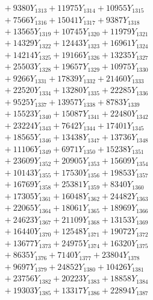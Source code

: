\documentclass[a4paper,10pt]{article}
\begin{document}
{\begin{align}
&\;  + 9380 Y_{1313} + 11975 Y_{1314} + 10955 Y_{1315} \\[0.3ex]
&\;  + 7566 Y_{1316} + 15041 Y_{1317} + 9387 Y_{1318} \\[0.5ex]\allowbreak
&\;  + 13565 Y_{1319} + 10745 Y_{1320} + 11979 Y_{1321} \\[0.3ex]
&\;  + 14329 Y_{1322} + 12443 Y_{1323} + 16961 Y_{1324} \\[0.3ex]
&\;  + 14214 Y_{1325} + 19166 Y_{1326} + 13235 Y_{1327} \\[0.3ex]
&\;  + 25503 Y_{1328} + 19657 Y_{1329} + 10975 Y_{1330} \\[0.3ex]
&\;  + 9266 Y_{1331} + 17839 Y_{1332} + 21460 Y_{1333} \\[0.3ex]
&\;  + 22520 Y_{1334} + 13280 Y_{1335} + 22285 Y_{1336} \\[0.3ex]
&\;  + 9525 Y_{1337} + 13957 Y_{1338} + 8783 Y_{1339} \\[0.3ex]
&\;  + 15523 Y_{1340} + 15087 Y_{1341} + 22480 Y_{1342} \\[0.3ex]
&\;  + 23224 Y_{1343} + 7642 Y_{1344} + 17401 Y_{1345} \\[0.3ex]
&\;  + 18565 Y_{1346} + 13438 Y_{1347} + 13736 Y_{1348} \\[0.5ex]\allowbreak
&\;  + 11106 Y_{1349} + 6971 Y_{1350} + 15238 Y_{1351} \\[0.3ex]
&\;  + 23609 Y_{1352} + 20905 Y_{1353} + 15609 Y_{1354} \\[0.3ex]
&\;  + 10143 Y_{1355} + 17530 Y_{1356} + 19853 Y_{1357} \\[0.3ex]
&\;  + 16769 Y_{1358} + 25381 Y_{1359} + 8340 Y_{1360} \\[0.3ex]
&\;  + 17305 Y_{1361} + 16048 Y_{1362} + 24482 Y_{1363} \\[0.3ex]
&\;  + 22065 Y_{1364} + 18061 Y_{1365} + 18969 Y_{1366} \\[0.3ex]
&\;  + 24623 Y_{1367} + 21109 Y_{1368} + 13153 Y_{1369} \\[0.3ex]
&\;  + 16440 Y_{1370} + 12548 Y_{1371} + 19072 Y_{1372} \\[0.3ex]
&\;  + 13677 Y_{1373} + 24975 Y_{1374} + 16320 Y_{1375} \\[0.3ex]
&\;  + 8635 Y_{1376} + 7140 Y_{1377} + 23804 Y_{1378} \\[0.5ex]\allowbreak
&\;  + 9697 Y_{1379} + 24852 Y_{1380} + 10426 Y_{1381} \\[0.3ex]
&\;  + 23756 Y_{1382} + 20223 Y_{1383} + 18858 Y_{1384} \\[0.3ex]
&\;  + 19303 Y_{1385} + 13317 Y_{1386} + 22894 Y_{1387} \\[0.3ex]

\end{align}}
\end{document}
